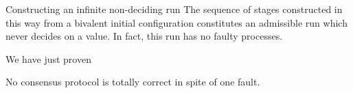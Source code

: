 \documentclass{beamer}
\begin{document}
\begin{frame}{Constructing an infinite non-deciding run}
  The sequence of stages constructed in this way from a bivalent initial configuration constitutes an admissible run which never decides on a value. In fact, this run has \alert{no faulty processes}.

  We have just proven
  \begin{theorem}
    No consensus protocol is totally correct in spite of one fault.
  \end{theorem}
\end{frame}
%
\end{document}

